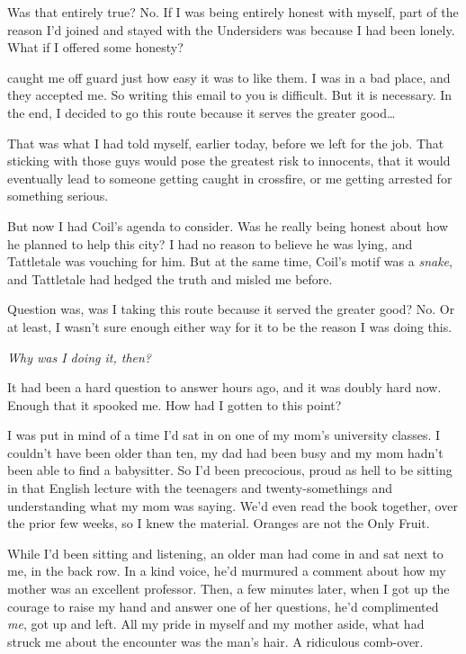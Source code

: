 Was that entirely true?  No.  If I was being entirely honest with myself, part of the reason I'd joined and stayed with the Undersiders was because I had been lonely.  What if I offered some honesty?



\ldotsIt caught me off guard just how easy it was to like them.  I was in a bad place, and they accepted me.  So writing this email to you is difficult.  But it is necessary.  In the end, I decided to go this route because it serves the greater good\ldots



That was what I had told myself, earlier today, before we left for the job.  That sticking with those guys would pose the greatest risk to innocents, that it would eventually lead to someone getting caught in crossfire, or me getting arrested for something serious.



But now I had Coil's agenda to consider.  Was he really being honest about how he planned to help this city?  I had no reason to believe he was lying, and Tattletale was vouching for him.  But at the same time, Coil's motif was a \emph{snake}, and Tattletale had hedged the truth and misled me before.



Question was, was I taking this route because it served the greater good?  No.  Or at least, I wasn't sure enough either way for it to be the reason I was doing this.



\emph{Why was I doing it, then?}



It had been a hard question to answer hours ago, and it was doubly hard now.  Enough that it spooked me.  How had I gotten to this point?



I was put in mind of a time I'd sat in on one of my mom's university classes.  I couldn't have been older than ten, my dad had been busy and my mom hadn't been able to find a babysitter.  So I'd been precocious, proud as hell to be sitting in that English lecture with the teenagers and twenty-somethings and understanding what my mom was saying.  We'd even read the book together, over the prior few weeks, so I knew the material.  Oranges are not the Only Fruit.



While I'd been sitting and listening, an older man had come in and sat next to me, in the back row.  In a kind voice, he'd murmured a comment about how my mother was an excellent professor.  Then, a few minutes later, when I got up the courage to raise my hand and answer one of her questions, he'd complimented \emph{me}, got up and left.  All my pride in myself and my mother aside, what had struck me about the encounter was the man's hair.  A ridiculous comb-over.




